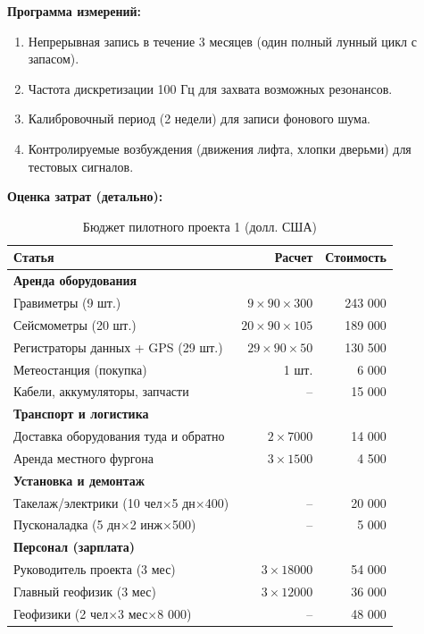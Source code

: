 \documentclass[12pt,a4paper]{article}
\theoremstyle{remark}
\begin{document}
	\textbf{Программа измерений:}
	\begin{enumerate}
		\item Непрерывная запись в течение 3 месяцев (один полный лунный цикл с запасом).
		\item Частота дискретизации 100 Гц для захвата возможных резонансов.
		\item Калибровочный период (2 недели) для записи фонового шума.
		\item Контролируемые возбуждения (движения лифта, хлопки дверьми) для тестовых сигналов.
	\end{enumerate}
	
	\textbf{Оценка затрат (детально):}
	\begin{table}[htbp]
		\centering
		\caption{Бюджет пилотного проекта 1 (долл. США)}
		\label{tab:budget-building}
		\small
		\begin{tabular}{lrr}
			\toprule
			\textbf{Статья} & \textbf{Расчет} & \textbf{Стоимость} \\
			\midrule
			\multicolumn{3}{l}{\textbf{Аренда оборудования}} \\
			Гравиметры (9 шт.) & $9\times90\times300$ & 243 000 \\
			Сейсмометры (20 шт.) & $20\times90\times105$ & 189 000 \\
			Регистраторы данных + GPS (29 шт.) & $29\times90\times50$ & 130 500 \\
			Метеостанция (покупка) & 1 шт. & 6 000 \\
			Кабели, аккумуляторы, запчасти & – & 15 000 \\
			\multicolumn{3}{l}{\textbf{Транспорт и логистика}} \\
			Доставка оборудования туда и обратно & $2\times7 000$ & 14 000 \\
			Аренда местного фургона & $3\times1 500$ & 4 500 \\
			\multicolumn{3}{l}{\textbf{Установка и демонтаж}} \\
			Такелаж/электрики (10 чел$\times$5 дн$\times$400) & – & 20 000 \\
			Пусконаладка (5 дн$\times$2 инж$\times$500) & – & 5 000 \\
			\multicolumn{3}{l}{\textbf{Персонал (зарплата)}} \\
			Руководитель проекта (3 мес) & $3\times18 000$ & 54 000 \\
			Главный геофизик (3 мес) & $3\times12 000$ & 36 000 \\
			Геофизики (2 чел$\times$3 мес$\times$8 000) & – & 48 000 \\

\end{tabular}
\end{table}
\end{document}
